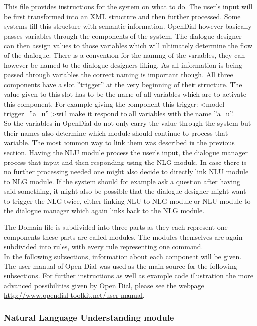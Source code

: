 \documentclass[a4paper, 12pt]{article}
\begin{document}
This file provides instructions for the system on what to do.
The user's input will be first transformed into an XML structure and then further processed.
Some systems fill this structure with semantic information.
OpenDial however basically passes variables through the components of the system.
The dialogue designer can then assign values to those variables which will ultimately determine the flow of the dialogue.
There is a convention for the naming of the variables, they can however be named to the dialogue designers liking.
As all information is being passed through variables the correct naming is important though.
All three components have a slot ”trigger” at the very beginning of their structure.
The value given to this slot has to be the name of all variables which are to activate this component.
For example giving the component this trigger:
\textless model trigger=”a\_u” \textgreater will make it respond to all variables with the name ”a\_u”. \\


So the variables in OpenDial do not only carry the value through the system but their names also determine which module should continue to process that variable.
The most common way to link them was described in the previous section.
Having the NLU module process the user's input, the dialogue manager process that input and then responding using the NLG module.
In case there is no further processing needed one might also decide to directly link NLU module to NLG module.
If the system should for example ask a question after having said something, it might also be possible that the dialogue designer might want to trigger the NLG twice, either linking NLU to NLG module or NLU module to the dialogue manager which again links back to the NLG module.


The Domain-file is subdivided into three parts as they each represent one components these parts are called modules.
The modules themselves are again subdivided into rules, with every rule representing one command.\\

In the following subsections, information about each component will be given.
The user-manual of Open Dial \cite{OpenDial} was used as the main source for the following subsections.
For further instructions as well as example code illustration the more advanced possibilities given by Open Dial, please see the webpage \url{http://www.opendial-toolkit.net/user-manual}.

\subsubsection{Natural Language Understanding module}
\end{document}
